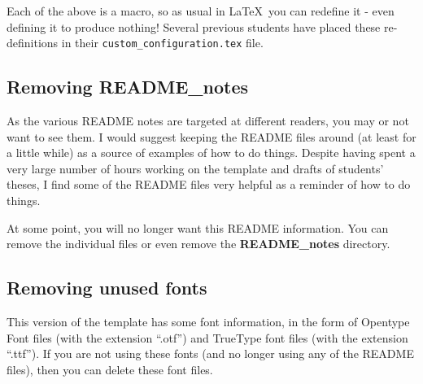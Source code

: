 \documentclass[12pt, twoside]{article}
\newif\ifinswedish
\newcommand{\dname}[1]{\textbf{#1}}
\newcommand{\fname}[1]{\texttt{#1}}
\begin{document}
Each of the above is a macro, so as usual in \LaTeX\ you can redefine it - even defining it to produce nothing! Several previous students have placed these \hbox{re-definitions} in their \fname{custom\_configuration.tex} file.

\subsection{Removing README\_notes}
As the various README notes are targeted at different readers, you may or not want to see them.
I would suggest keeping the README files around (at least for a little while) as a source of examples of how to do things. Despite having spent a very large number of hours working on the template and drafts of students' theses, I find some of the README files very helpful as a reminder of how to do things.

At some point, you will no longer want this README information. You can remove the individual files or even remove the \dname{README\_notes} directory.

\subsection{Removing unused fonts}
This version of the template has some font information, in the form of Opentype Font files (with the extension \enquote{.otf}) and TrueType font files (with the extension \enquote{.ttf}). If you are not using these fonts (and no longer using any of the README files), then you can delete these font files.
\clearpage

\ifinswedish
\printglossary[style=mylong, type=\acronymtype, title={Lista över akronymer
och förkortningar}]
\else
\printnoidxglossary[type=\acronymtype, style=mylong, title={List of Acronyms and Abbreviations}]
\fi
\clearpage


\renewcommand{\bibname}{References}

\printbibliography[heading=bibintoc, title={References}]
\end{document}
